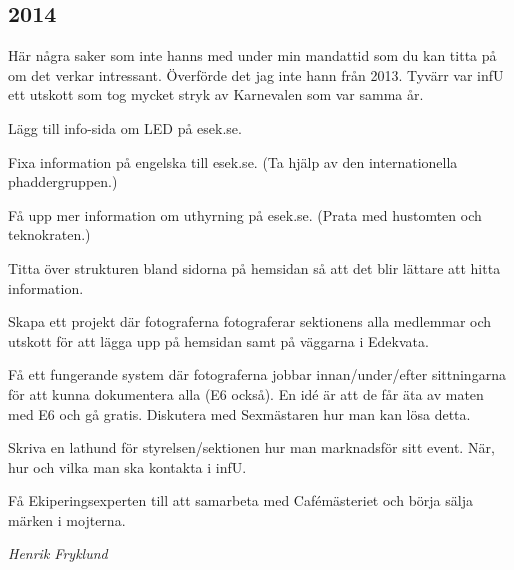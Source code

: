 \documentclass[10pt]{article}
\begin{document}
\subsection{2014}
Här några saker som inte hanns med under min mandattid som du kan titta på om det verkar intressant. Överförde det jag inte hann från 2013. Tyvärr var infU ett utskott som tog mycket stryk av Karnevalen som var samma år.
\begin{tightdashlist}
    \item Lägg till info-sida om LED på esek.se.
    \item Fixa information på engelska till esek.se. (Ta hjälp av den internationella phaddergruppen.)
    \item Få upp mer information om uthyrning på esek.se. (Prata med hustomten och teknokraten.)
    \item Titta över strukturen bland sidorna på hemsidan så att det blir lättare att hitta information.
    \item Skapa ett projekt där fotograferna fotograferar sektionens alla medlemmar och utskott för att lägga upp på hemsidan samt på väggarna i Edekvata.
    \item Få ett fungerande system där fotograferna jobbar innan/under/efter sittningarna för att kunna dokumentera alla (E6 också). En idé är att de får äta av maten med E6 och gå gratis. Diskutera med Sexmästaren hur man kan lösa detta.
    \item Skriva en lathund för styrelsen/sektionen hur man marknadsför sitt event. När, hur och vilka man ska kontakta i infU.
    \item Få Ekiperingsexperten till att samarbeta med Cafémästeriet och börja sälja märken i mojterna.
\end{tightdashlist}

\emph{Henrik Fryklund}
\newpage
\end{document}
